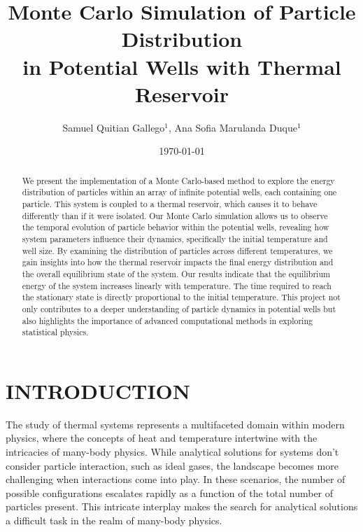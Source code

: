 \documentclass[%
 reprint,
 amsmath,amssymb,
 aps,
]{revtex4-2}
\begin{document}

\title{Monte Carlo Simulation of Particle Distribution \\in Potential Wells with Thermal Reservoir }%


\author{Samuel Quitian Gallego$^{1}$, Ana Sofia Marulanda Duque$^{1}$}

\date{\today}

\begin{abstract}
We present the implementation of a Monte Carlo-based method to explore the energy distribution of particles within an array of infinite potential wells, each containing one particle. This system is coupled to a thermal reservoir, which causes it to behave differently than if it were isolated. Our Monte Carlo simulation allows us to observe the temporal evolution of particle behavior within the potential wells, revealing how system parameters influence their dynamics, specifically the initial temperature and well size. By examining the distribution of particles across different temperatures, we gain insights into how the thermal reservoir impacts the final energy distribution and the overall equilibrium state of the system. Our results indicate that the equilibrium energy of the system increases linearly with temperature. The time required to reach the stationary state is directly proportional to the initial temperature. This project not only contributes to a deeper understanding of particle dynamics in potential wells but also highlights the importance of advanced computational methods in exploring statistical physics. 
\end{abstract}

\maketitle


\section{\label{sec:level1}INTRODUCTION}


The study of thermal systems represents a multifaceted domain within modern physics, where the concepts of heat and temperature intertwine with the intricacies of many-body physics. While analytical solutions for systems don't consider particle interaction, such as ideal gases, the landscape becomes more challenging when interactions come into play. In these scenarios, the number of possible configurations escalates rapidly as a function of the total number of particles present. This intricate interplay makes the search for analytical solutions a  difficult task in the realm of many-body physics.
\end{document}
